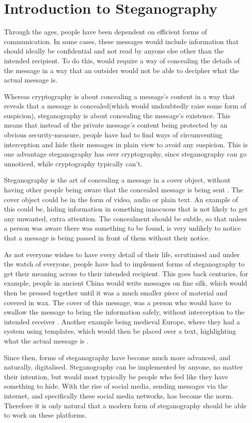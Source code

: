 \section{Introduction to Steganography}
Through the ages, people have been dependent on efficient forms of communication. In some cases, these messages would include information that should ideally be confidential and not read by anyone else other than the intended recipient. To do this, would require a way of concealing the details of the message in a way that an outsider would not be able to decipher what the actual message is.

Whereas cryptography is about concealing a message's content in a way that reveals that a message is concealed(which would undoubtedly raise some form of suspicion), steganography is about concealing the message's existence. This means that instead of the private message's content being protected by an obvious security-measure, people have had to find ways of circumventing interception and hide their messages in plain view to avoid any suspicion. This is one advantage steganography has over cryptography, since steganography can go unnoticed, while cryptography typically can't. 

Steganography is the art of concealing a message in a cover object, without having other people being aware that the concealed message is being sent \citep{Anderson1998}. The cover object could be in the form of video, audio or plain text. An example of this could be, hiding information in something innocuous that is not likely to get any unwanted, extra attention. The concealment should be subtle, so that unless a person was aware there was something to be found, is very unlikely to notice that a message is being passed in front of them without their notice.

As not everyone wishes to have every detail of their life, scrutinised and under the watch of everyone, people have had to implement forms of steganography to get their meaning across to their intended recipient. This goes back centuries, for example, people in ancient China would write messages on fine silk, which would then be pressed together until it was a much smaller piece of material and covered in wax. The cover of this message, was a person who would have to swallow the message to bring the information safely, without interception to the intended receiver \citep{Singh2001}. Another example being medieval Europe, where they had a system using templates, which would then be placed over a text, highlighting what the actual message is \citep{Anderson1998}.

Since then, forms of steganography have become much more advanced, and naturally, digitalised. Steganography can be implemented by anyone, no matter their intention, but would most typically be people who feel like they have something to hide. With the rise of social media, sending messages via the internet, and specifically these social media networks, has become the norm. Therefore it is only natural that a modern form of steganography should be able to work on these platforms. 
